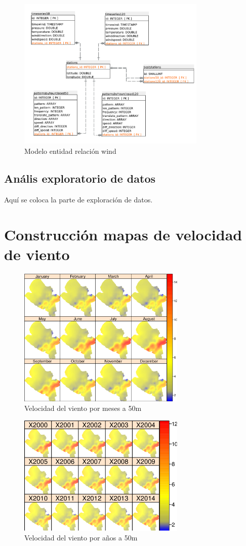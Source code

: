 \begin{figure}
  \centering
  \includegraphics[width = 9cm]{windET.pdf}
  \caption{Modelo entidad relación wind}
  \label{fig:windET}
\end{figure}


\subsection{Anális exploratorio de datos}

Aquí se coloca la parte de exploración de datos.


\section{Construcción mapas de velocidad de viento}



\begin{figure}
  \centering
  \includegraphics[width = 8cm]{mapMonthsWind.pdf}
  \caption{Velocidad del viento por meses a 50m}
  \label{fig:meses}
\end{figure}

\begin{figure}
  \centering
  \includegraphics[width = 8cm]{mapYearsWind.pdf}
  \caption{Velocidad del viento por años a 50m}
  \label{fig:anios}
\end{figure}

